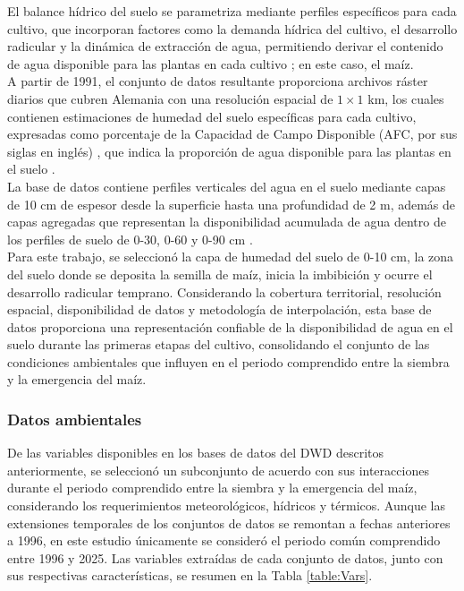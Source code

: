 El balance hídrico del suelo se parametriza mediante perfiles específicos para cada cultivo, que incorporan factores como la demanda hídrica del cultivo, el desarrollo radicular y la dinámica de extracción de agua, permitiendo derivar el contenido de agua disponible para las plantas en cada cultivo \citep{Herbst_2021}; en este caso, el maíz.\\

A partir de 1991, el conjunto de datos resultante proporciona archivos ráster diarios que cubren Alemania con una resolución espacial de $1 \times 1$ km, los cuales contienen estimaciones de humedad del suelo específicas para cada cultivo, expresadas como porcentaje de la Capacidad de Campo Disponible (AFC, por sus siglas en inglés) \citep{DWD_soilmoisture_maize}, que indica la proporción de agua disponible para las plantas en el suelo \citep{DWD_nFK}.\\

La base de datos contiene perfiles verticales del agua en el suelo mediante capas de 10 cm de espesor desde la superficie hasta una profundidad de 2 m, además de capas agregadas que representan la disponibilidad acumulada de agua dentro de los perfiles de suelo de 0-30, 0-60 y 0-90 cm \citep{DWD_soilmoisture_maize}.\\

Para este trabajo, se seleccionó la capa de humedad del suelo de 0-10 cm, la zona del suelo donde se deposita la semilla de maíz, inicia la imbibición y ocurre el desarrollo radicular temprano. Considerando la cobertura territorial, resolución espacial, disponibilidad de datos y metodología de interpolación, esta base de datos proporciona una representación confiable de la disponibilidad de agua en el suelo durante las primeras etapas del cultivo, consolidando el conjunto de las condiciones ambientales que influyen en el periodo comprendido entre la siembra y la emergencia del maíz.\\

\subsubsection{Datos ambientales}

De las variables disponibles en los bases de datos del DWD descritos anteriormente, se seleccionó un subconjunto de acuerdo con sus interacciones durante el periodo comprendido entre la siembra y la emergencia del maíz, considerando los requerimientos meteorológicos, hídricos y térmicos. Aunque las extensiones temporales de los conjuntos de datos se remontan a fechas anteriores a 1996, en este estudio únicamente se consideró el periodo común comprendido entre 1996 y 2025. Las variables extraídas de cada conjunto de datos, junto con sus respectivas características, se resumen en la Tabla \ref{table:Vars}.\\



